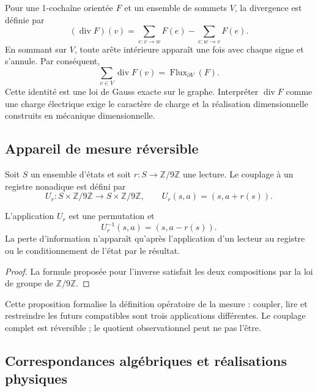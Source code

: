 Pour une 1-cochaîne orientée \(F\) et un ensemble de sommets \(V\), la
divergence est définie par
\[
 (\operatorname{div}F)(v)=
 \sum_{e:v\to w}F(e)-\sum_{e:w\to v}F(e).
\]
En sommant sur \(V\), toute arête intérieure apparaît une fois avec chaque signe et
s’annule. Par conséquent,
\[
 \boxed{
 \sum_{v\in V}\operatorname{div}F(v)
 =\operatorname{Flux}_{\partial V}(F).}
\]
Cette identité est une loi de Gauss exacte sur le graphe. Interpréter
\(\operatorname{div}F\) comme une charge électrique exige le caractère de charge et la
réalisation dimensionnelle construits en mécanique dimensionnelle.

\subsection{Appareil de mesure réversible}
\label{v:rec:completaciones:section:10}

Soit \(S\) un ensemble d’états et soit \(r:S\to\mathbb Z/9\mathbb Z\) une
lecture. Le couplage à un registre nonadique est défini par
\[
 U_r:S\times\mathbb Z/9\mathbb Z\longrightarrow
 S\times\mathbb Z/9\mathbb Z,
 \qquad
 U_r(s,a)=(s,a+r(s)).
\]

\begin{proposition}
\label{v:rec:completaciones:statement:05}
L’application \(U_r\) est une permutation et
\[
 U_r^{-1}(s,a)=(s,a-r(s)).
\]
La perte d’information n’apparaît qu’après l’application d’un lecteur au
registre ou le conditionnement de l’état par le résultat.
\end{proposition}

\begin{proof}
La formule proposée pour l’inverse satisfait les deux compositions par la
loi de groupe de \(\mathbb Z/9\mathbb Z\).
\end{proof}

Cette proposition formalise la définition opératoire de la mesure : coupler,
lire et restreindre les futurs compatibles sont trois applications différentes. Le
couplage complet est réversible ; le quotient observationnel peut ne pas l’être.

\subsection{Correspondances algébriques et réalisations physiques}
\label{v:rec:completaciones:section:11}

